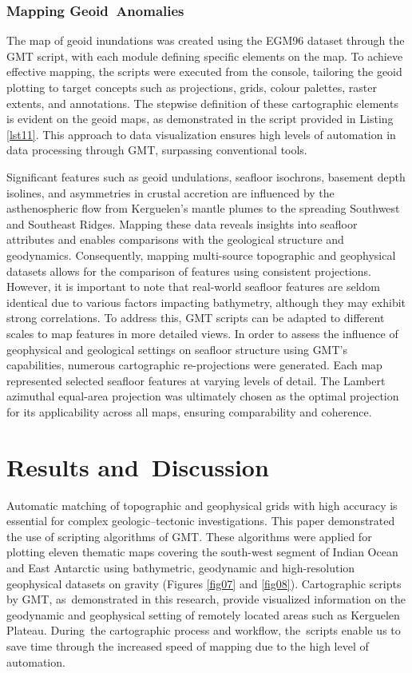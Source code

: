 \documentclass[geomatics,article,accept,pdftex,moreauthors]{Definitions/mdpi}
\begin{document}
\subsubsection{Mapping Geoid~Anomalies}

The map of geoid inundations was created using the EGM96 dataset through the GMT script, with each module defining specific elements on the map. To achieve effective mapping, the scripts were executed from the console, tailoring the geoid plotting to target concepts such as projections, grids, colour palettes, raster extents, and annotations. The stepwise definition of these cartographic elements is evident on the geoid maps, as demonstrated in the script provided in Listing \ref{lst11}. This approach to data visualization ensures high levels of automation in data processing through GMT, surpassing conventional tools.

Significant features such as geoid undulations, seafloor isochrons, basement depth isolines, and asymmetries in crustal accretion are influenced by the asthenospheric flow from Kerguelen's mantle plumes to the spreading Southwest and Southeast Ridges. Mapping these data reveals insights into seafloor attributes and enables comparisons with the geological structure and geodynamics. Consequently, mapping multi-source topographic and geophysical datasets allows for the comparison of features using consistent projections. However, it is important to note that real-world seafloor features are seldom identical due to various factors impacting bathymetry, although they may exhibit strong correlations. To address this, GMT scripts can be adapted to different scales to map features in more detailed views. In order to assess the influence of geophysical and geological settings on seafloor structure using GMT's capabilities, numerous cartographic re-projections were generated. Each map represented selected seafloor features at varying levels of detail. The Lambert azimuthal equal-area projection was ultimately chosen as the optimal projection for its applicability across all maps, ensuring comparability and coherence. %

\section{Results and~Discussion}

Automatic matching of topographic and geophysical grids with high accuracy is essential for complex geologic--tectonic investigations. This paper demonstrated the use of scripting algorithms of GMT. These algorithms were applied for plotting eleven thematic maps covering the south-west segment of Indian Ocean and East Antarctic using bathymetric, geodynamic and high-resolution geophysical datasets on gravity (Figures \ref{fig07} and \ref{fig08}). Cartographic scripts by GMT, as~demonstrated in this research, provide visualized information on the geodynamic and geophysical setting of remotely located areas such as Kerguelen Plateau. During~the cartographic process and workflow, the~scripts enable us to save time through the increased speed of mapping due to the high level of automation. 
\end{document}

